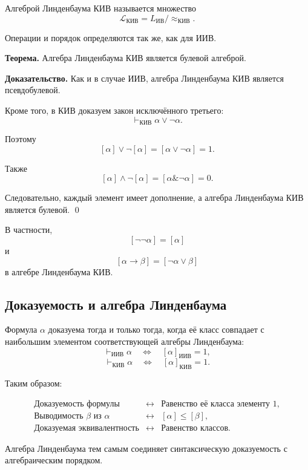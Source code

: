 \documentclass[12pt,a4paper,oneside,openany]{book}
\theoremstyle{definition}
\theoremstyle{plain}
\theoremstyle{remark}
\begin{document}
Алгеброй Линденбаума КИВ называется множество
\[
\mathcal L_{\mathrm{КИВ}}
=
L_{\mathrm{ИВ}}/{\approx_{\mathrm{КИВ}}}.
\]

Операции и порядок определяются так же, как для ИИВ.

\textbf{Теорема.}
Алгебра Линденбаума КИВ является булевой алгеброй.

\textbf{Доказательство.}
Как и в случае ИИВ, алгебра Линденбаума КИВ является псевдобулевой.

Кроме того, в КИВ доказуем закон исключённого третьего:
\[
\vdash_{\mathrm{КИВ}}
\alpha\lor\neg\alpha.
\]

Поэтому
\[
[\alpha]\vee\neg[\alpha]
=
[\alpha\lor\neg\alpha]
=
1.
\]

Также
\[
[\alpha]\wedge\neg[\alpha]
=
[\alpha\mathbin{\&}\neg\alpha]
=
0.
\]

Следовательно, каждый элемент имеет дополнение, а алгебра
Линденбаума КИВ является булевой.
\qed

В частности,
\[
[\neg\neg\alpha]=[\alpha]
\]
и
\[
[\alpha\to\beta]
=
[\neg\alpha\lor\beta]
\]
в алгебре Линденбаума КИВ.

\subsection{Доказуемость и алгебра Линденбаума}

Формула \(\alpha\) доказуема тогда и только тогда, когда её класс
совпадает с наибольшим элементом соответствующей алгебры
Линденбаума:
\[
\vdash_{\mathrm{ИИВ}}\alpha
\quad\Longleftrightarrow\quad
[\alpha]_{\mathrm{ИИВ}}=1,
\]
\[
\vdash_{\mathrm{КИВ}}\alpha
\quad\Longleftrightarrow\quad
[\alpha]_{\mathrm{КИВ}}=1.
\]

Таким образом:

\[
\boxed{
\begin{array}{ccc}
\text{Доказуемость формулы}
&
\longleftrightarrow
&
\text{Равенство её класса элементу }1,
\\[2mm]
\text{Выводимость }\beta\text{ из }\alpha
&
\longleftrightarrow
&
[\alpha]\leq[\beta],
\\[2mm]
\text{Доказуемая эквивалентность}
&
\longleftrightarrow
&
\text{Равенство классов}.
\end{array}
}
\]

Алгебра Линденбаума тем самым соединяет синтаксическую доказуемость
с алгебраическим порядком.
\end{document}

